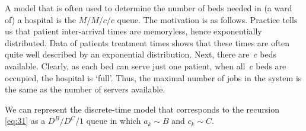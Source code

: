 \documentclass[queueing-book.tex]{subfiles}
\begin{document}
A model that is often used to determine the number of beds needed in (a ward of) a hospital is the $M/M/c/c$ queue.
The motivation is as follows.
Practice tells us that patient inter-arrival times are memoryless, hence exponentially distributed.
Data of patients treatment times shows that these times are often quite well described by an exponential distribution.
Next, there are~$c$ beds available.
Clearly, as each bed can serve just one patient, when all~$c$ beds are occupied, the hospital is `full'.
Thus, the maximal number of jobs in the system is the same as the number of servers available.

We can represent the discrete-time model  that corresponds to the recursion \cref{eq:31} as a $D^{B}/D^{C}/1$ queue in which $a_{k}\sim B$ and $c_{k}\sim C$.




\end{document}
